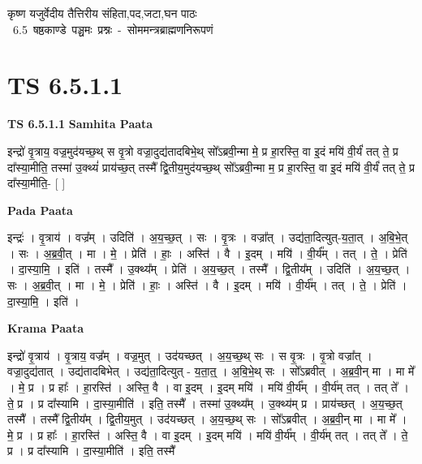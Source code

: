 \documentclass[17pt]{extarticle}
\begin{document}
\begin{titlepage}
    \begin{center}
 
\begin{sanskrit}
    { \Large
    कृष्ण यजुर्वेदीय तैत्तिरीय संहिता,पद,जटा,घन पाठः 
    }
    \\
    \vspace{2.5cm}
    \mbox{ \Large
    6.5      षष्ठकाण्डे पञ्चमः प्रश्नः - सोममन्त्रब्राह्मणनिरूपणं   }
\end{sanskrit}
\end{center}

\end{titlepage}
\tableofcontents
{}
\pagebreak


\section{ TS 6.5.1.1 }

\textbf{TS 6.5.1.1 } \newline
\textbf{Samhita Paata} \newline

इन्द्रो॑ वृ॒त्राय॒ वज्र॒मुद॑यच्छ॒थ् स वृ॒त्रो वज्रा॒दुद्य॑तादबिभे॒थ् सो᳚ऽब्रवी॒न्मा मे॒ प्र हा॒रस्ति॒ वा इ॒दं मयि॑ वी॒र्यं॑ तत् ते॒ प्र दा᳚स्या॒मीति॒ तस्मा॑ उ॒क्थ्यं॑ प्राय॑च्छ॒त् तस्मै᳚ द्वि॒तीय॒मुद॑यच्छ॒थ् सो᳚ऽब्रवी॒न्मा म॒ प्र हा॒रस्ति॒ वा इ॒दं मयि॑ वी॒र्यं॑ तत् ते॒ प्र दा᳚स्या॒मीति॒- [  ] \newline

\textbf{Pada Paata} \newline

इन्द्रः॑ । वृ॒त्राय॑ । वज्र᳚म् । उदिति॑ । अ॒य॒च्छ॒त् । सः । वृ॒त्रः । वज्रा᳚त् । उद्य॑ता॒दित्युत्-य॒ता॒त् । अ॒बि॒भे॒त् । सः । अ॒ब्र॒वी॒त् । मा । मे॒ । प्रेति॑ । हाः॒ । अस्ति॑ । वै । इ॒दम् । मयि॑ । वी॒र्य᳚म् । तत् । ते॒ । प्रेति॑ । दा॒स्या॒मि॒ । इति॑ । तस्मै᳚ । उ॒क्थ्य᳚म् । प्रेति॑ । अ॒य॒च्छ॒त् । तस्मै᳚ । द्वि॒तीय᳚म् । उदिति॑ । अ॒य॒च्छ॒त् । सः । अ॒ब्र॒वी॒त् । मा । मे॒ । प्रेति॑ । हाः॒ । अस्ति॑ । वै । इ॒दम् । मयि॑ । वी॒र्य᳚म् । तत् । ते॒ । प्रेति॑ । दा॒स्या॒मि॒ । इति॑ ।  \newline


\textbf{Krama Paata} \newline

इन्द्रो॑ वृ॒त्राय॑ । वृ॒त्राय॒ वज्र᳚म् । वज्र॒मुत् । उद॑यच्छत् । अ॒य॒च्छ॒थ् सः । स वृ॒त्रः । वृ॒त्रो वज्रा᳚त् । वज्रा॒दुद्य॑तात् । उद्य॑तादबिभेत् । उद्य॑ता॒दित्युत् - य॒ता॒त्॒ । अ॒बि॒भे॒थ् सः । सो᳚ऽब्रवीत् । अ॒ब्र॒वी॒न् मा । मा मे᳚ । मे॒ प्र । प्र हाः᳚ । हा॒रस्ति॑ । अस्ति॒ वै । वा इ॒दम् । इ॒दम् मयि॑ । मयि॑ वी॒र्य᳚म् । वी॒र्य॑म् तत् । तत् ते᳚ । ते॒ प्र । प्र दा᳚स्यामि । दा॒स्या॒मीति॑ । इति॒ तस्मै᳚ । तस्मा॑ उ॒क्थ्य᳚म् । उ॒क्थ्य॑म् प्र । प्राय॑च्छत् । अ॒य॒च्छ॒त् तस्मै᳚ । तस्मै᳚ द्वि॒तीय᳚म् । द्वि॒तीय॒मुत् । उद॑यच्छत् । अ॒य॒च्छ॒थ् सः । सो᳚ऽब्रवीत् । अ॒ब्र॒वी॒न् मा । मा मे᳚ । मे॒ प्र । प्र हाः᳚ । हा॒रस्ति॑ । अस्ति॒ वै । वा इ॒दम् । इ॒दम् मयि॑ । मयि॑ वी॒र्य᳚म् । वी॒र्य॑म् तत् । तत् ते᳚ । ते॒ प्र । प्र दा᳚स्यामि । दा॒स्या॒मीति॑ । इति॒ तस्मै᳚ \newline
\end{document}
